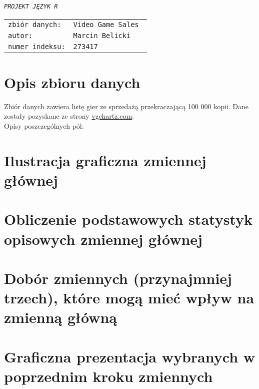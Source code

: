 \newcommand*{\includesDirectory}{includes}
\newcommand*{\settingsDirectory}{\includesDirectory/settings}








	\thispagestyle{empty}
	\vspace*{\fill}
			\begin{center}
				\Huge{
					\textit{\texttt{PROJEKT JĘZYK R}}
				}
			\end{center}
	\vspace*{\fill}
			\begin{tabular}{ll}
				\texttt{zbiór danych:}  & \texttt{Video Game Sales \cite{source}}\\
				\texttt{autor:}         & \texttt{Marcin Belicki}\\
				\texttt{numer indeksu:} & \texttt{273417}
			\end{tabular}
	\newpage
	\setlength{\parindent}{9mm}
	
	\section{Opis zbioru danych}
		Zbiór danych zawiera listę gier ze sprzedażą przekraczającą 100 000 kopii. Dane zostały pozyskane ze strony \href{https://www.vgchartz.com/}{vgchartz.com}.\\
		Opisy poszczególnych pól:
		
	

	
	\section{Ilustracja graficzna zmiennej głównej}
	
	\section{Obliczenie podstawowych statystyk opisowych zmiennej głównej}
	
	\section{Dobór zmiennych (przynajmniej trzech), które mogą mieć wpływ na zmienną główną}
	
	\section{Graficzna prezentacja wybranych w poprzednim kroku zmiennych}
	
